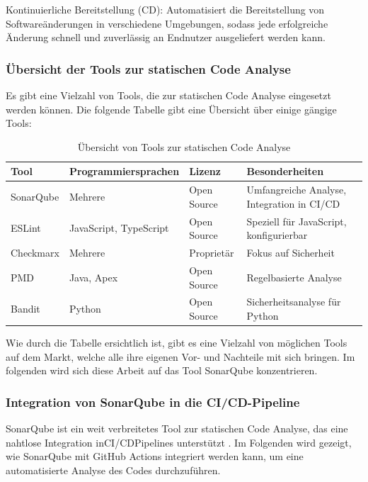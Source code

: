 Kontinuierliche Bereitstellung (CD): Automatisiert die Bereitstellung von Softwareänderungen in verschiedene Umgebungen, sodass jede erfolgreiche Änderung schnell und zuverlässig an Endnutzer ausgeliefert werden kann.


\subsubsection{Übersicht der Tools zur statischen Code Analyse}

Es gibt eine Vielzahl von Tools, die zur statischen Code Analyse eingesetzt werden können. Die folgende Tabelle gibt eine Übersicht über einige gängige Tools:

\begin{table}[h!]
\centering
\begin{tabular}{|l|l|l|l|}
\hline
\textbf{Tool} & \textbf{Programmiersprachen} & \textbf{Lizenz} & \textbf{Besonderheiten} \\ \hline
SonarQube & Mehrere & Open Source & Umfangreiche Analyse, Integration in CI/CD \\ \hline
ESLint & JavaScript, TypeScript & Open Source & Speziell für JavaScript, konfigurierbar \\ \hline
Checkmarx & Mehrere & Proprietär & Fokus auf Sicherheit \\ \hline
PMD & Java, Apex & Open Source & Regelbasierte Analyse \\ \hline
Bandit & Python & Open Source & Sicherheitsanalyse für Python \\ \hline
\end{tabular}
\caption{Übersicht von Tools zur statischen Code Analyse}
\label{tab:static_code_analysis_tools}
\end{table}

Wie durch die Tabelle ersichtlich ist, gibt es eine Vielzahl von möglichen Tools auf dem Markt, welche alle ihre eigenen Vor- und Nachteile mit sich bringen. Im folgenden wird sich diese Arbeit auf das Tool SonarQube konzentrieren.

\subsubsection{Integration von SonarQube in die CI/CD-Pipeline}

SonarQube ist ein weit verbreitetes Tool zur statischen Code Analyse, das eine nahtlose Integration in\ac{CI/CD}Pipelines unterstützt \cite{SonarSource2023}. Im Folgenden wird gezeigt, wie SonarQube mit GitHub Actions integriert werden kann, um eine automatisierte Analyse des Codes durchzuführen.

